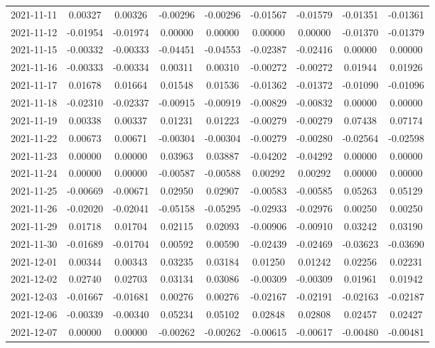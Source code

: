\begin{footnotesize}
\begin{longtable}{lcccccccc}
2021-11-11 & 0.00327 & 0.00326 & -0.00296 & -0.00296 & -0.01567 & -0.01579 & -0.01351 & -0.01361 \\
2021-11-12 & -0.01954 & -0.01974 & 0.00000 & 0.00000 & 0.00000 & 0.00000 & -0.01370 & -0.01379 \\
2021-11-15 & -0.00332 & -0.00333 & -0.04451 & -0.04553 & -0.02387 & -0.02416 & 0.00000 & 0.00000 \\
2021-11-16 & -0.00333 & -0.00334 & 0.00311 & 0.00310 & -0.00272 & -0.00272 & 0.01944 & 0.01926 \\
2021-11-17 & 0.01678 & 0.01664 & 0.01548 & 0.01536 & -0.01362 & -0.01372 & -0.01090 & -0.01096 \\
2021-11-18 & -0.02310 & -0.02337 & -0.00915 & -0.00919 & -0.00829 & -0.00832 & 0.00000 & 0.00000 \\
2021-11-19 & 0.00338 & 0.00337 & 0.01231 & 0.01223 & -0.00279 & -0.00279 & 0.07438 & 0.07174 \\
2021-11-22 & 0.00673 & 0.00671 & -0.00304 & -0.00304 & -0.00279 & -0.00280 & -0.02564 & -0.02598 \\
2021-11-23 & 0.00000 & 0.00000 & 0.03963 & 0.03887 & -0.04202 & -0.04292 & 0.00000 & 0.00000 \\
2021-11-24 & 0.00000 & 0.00000 & -0.00587 & -0.00588 & 0.00292 & 0.00292 & 0.00000 & 0.00000 \\
2021-11-25 & -0.00669 & -0.00671 & 0.02950 & 0.02907 & -0.00583 & -0.00585 & 0.05263 & 0.05129 \\
2021-11-26 & -0.02020 & -0.02041 & -0.05158 & -0.05295 & -0.02933 & -0.02976 & 0.00250 & 0.00250 \\
2021-11-29 & 0.01718 & 0.01704 & 0.02115 & 0.02093 & -0.00906 & -0.00910 & 0.03242 & 0.03190 \\
2021-11-30 & -0.01689 & -0.01704 & 0.00592 & 0.00590 & -0.02439 & -0.02469 & -0.03623 & -0.03690 \\
2021-12-01 & 0.00344 & 0.00343 & 0.03235 & 0.03184 & 0.01250 & 0.01242 & 0.02256 & 0.02231 \\
2021-12-02 & 0.02740 & 0.02703 & 0.03134 & 0.03086 & -0.00309 & -0.00309 & 0.01961 & 0.01942 \\
2021-12-03 & -0.01667 & -0.01681 & 0.00276 & 0.00276 & -0.02167 & -0.02191 & -0.02163 & -0.02187 \\
2021-12-06 & -0.00339 & -0.00340 & 0.05234 & 0.05102 & 0.02848 & 0.02808 & 0.02457 & 0.02427 \\
2021-12-07 & 0.00000 & 0.00000 & -0.00262 & -0.00262 & -0.00615 & -0.00617 & -0.00480 & -0.00481 \\

\end{longtable}
\end{footnotesize}
